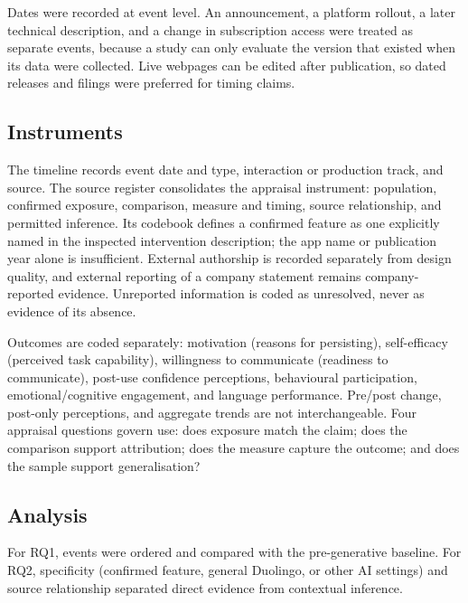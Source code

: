 \documentclass[11pt,titlepage]{article}
\begin{document}
Dates were recorded at event level. An announcement, a platform rollout, a later technical description, and a change in subscription access were treated as separate events, because a study can only evaluate the version that existed when its data were collected. Live webpages can be edited after publication, so dated releases and filings were preferred for timing claims.

\subsection{Instruments}
The timeline records event date and type, interaction or production track, and source. The source register consolidates the appraisal instrument: population, confirmed exposure, comparison, measure and timing, source relationship, and permitted inference. Its codebook defines a confirmed feature as one explicitly named in the inspected intervention description; the app name or publication year alone is insufficient. External authorship is recorded separately from design quality, and external reporting of a company statement remains company-reported evidence. Unreported information is coded as unresolved, never as evidence of its absence.

Outcomes are coded separately: motivation (reasons for persisting), self-efficacy (perceived task capability), willingness to communicate (readiness to communicate), post-use confidence perceptions, behavioural participation, emotional/cognitive engagement, and language performance. Pre/post change, post-only perceptions, and aggregate trends are not interchangeable. Four appraisal questions govern use: does exposure match the claim; does the comparison support attribution; does the measure capture the outcome; and does the sample support generalisation?

\subsection{Analysis}
For RQ1, events were ordered and compared with the pre-generative baseline. For RQ2, specificity (confirmed feature, general Duolingo, or other AI settings) and source relationship separated direct evidence from contextual inference.
\end{document}
